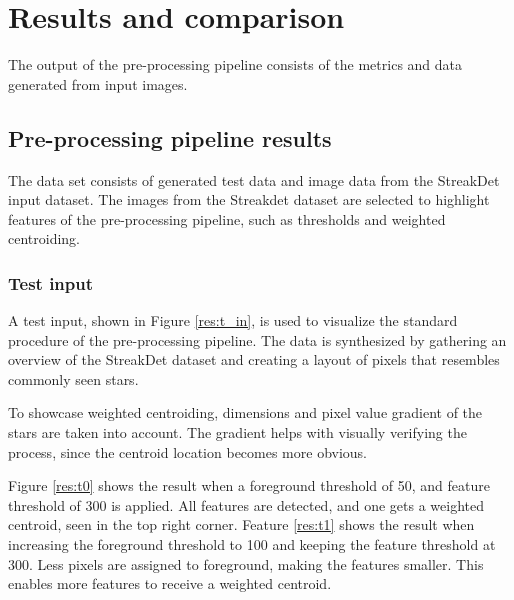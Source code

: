 \documentclass[12pt]{report}
\begin{document}
\chapter{Results and comparison}

The output of the pre-processing pipeline consists of the metrics and data generated from input images. 


\section{Pre-processing pipeline results}
The data set consists of generated test data and image data from the StreakDet input dataset. The images from the Streakdet dataset are selected to highlight features of the pre-processing pipeline, such as thresholds and weighted centroiding.

\subsection*{Test input}
A test input, shown in Figure \ref{res:t_in}, is used to visualize the standard procedure of the pre-processing pipeline. The data is synthesized by gathering an overview of the StreakDet dataset and creating a layout of pixels that resembles commonly seen stars.
\par
To showcase weighted centroiding, dimensions and pixel value gradient of the stars are taken into account. The gradient helps with visually verifying the process, since the centroid location becomes more obvious.
\par
Figure \ref{res:t0} shows the result when a foreground threshold of 50, and feature threshold of 300 is applied. All features are detected, and one gets a weighted centroid, seen in the top right corner. Feature \ref{res:t1} shows the result when increasing the foreground threshold to 100 and keeping the feature threshold at 300. Less pixels are assigned to foreground, making the features smaller. This enables more features to receive a weighted centroid. 
\end{document}
